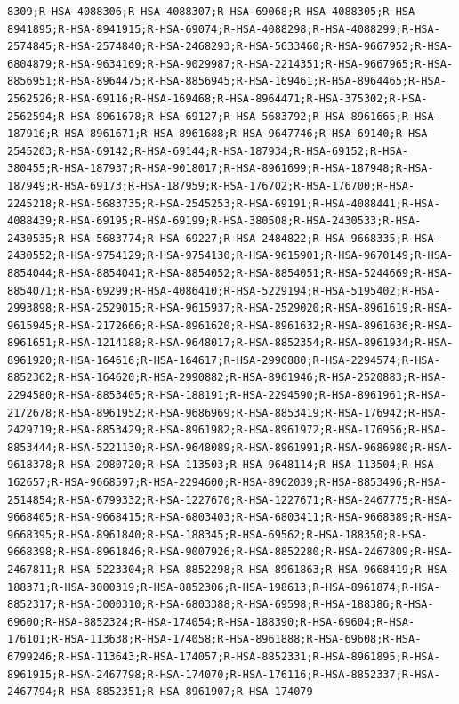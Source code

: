 \documentclass[
  letterpaper,
  DIV=11,
  numbers=noendperiod]{scrartcl}
\begin{document}
\begin{verbatim}
8309;R-HSA-4088306;R-HSA-4088307;R-HSA-69068;R-HSA-4088305;R-HSA-8941895;R-HSA-8941915;R-HSA-69074;R-HSA-4088298;R-HSA-4088299;R-HSA-2574845;R-HSA-2574840;R-HSA-2468293;R-HSA-5633460;R-HSA-9667952;R-HSA-6804879;R-HSA-9634169;R-HSA-9029987;R-HSA-2214351;R-HSA-9667965;R-HSA-8856951;R-HSA-8964475;R-HSA-8856945;R-HSA-169461;R-HSA-8964465;R-HSA-2562526;R-HSA-69116;R-HSA-169468;R-HSA-8964471;R-HSA-375302;R-HSA-2562594;R-HSA-8961678;R-HSA-69127;R-HSA-5683792;R-HSA-8961665;R-HSA-187916;R-HSA-8961671;R-HSA-8961688;R-HSA-9647746;R-HSA-69140;R-HSA-2545203;R-HSA-69142;R-HSA-69144;R-HSA-187934;R-HSA-69152;R-HSA-380455;R-HSA-187937;R-HSA-9018017;R-HSA-8961699;R-HSA-187948;R-HSA-187949;R-HSA-69173;R-HSA-187959;R-HSA-176702;R-HSA-176700;R-HSA-2245218;R-HSA-5683735;R-HSA-2545253;R-HSA-69191;R-HSA-4088441;R-HSA-4088439;R-HSA-69195;R-HSA-69199;R-HSA-380508;R-HSA-2430533;R-HSA-2430535;R-HSA-5683774;R-HSA-69227;R-HSA-2484822;R-HSA-9668335;R-HSA-2430552;R-HSA-9754129;R-HSA-9754130;R-HSA-9615901;R-HSA-9670149;R-HSA-8854044;R-HSA-8854041;R-HSA-8854052;R-HSA-8854051;R-HSA-5244669;R-HSA-8854071;R-HSA-69299;R-HSA-4086410;R-HSA-5229194;R-HSA-5195402;R-HSA-2993898;R-HSA-2529015;R-HSA-9615937;R-HSA-2529020;R-HSA-8961619;R-HSA-9615945;R-HSA-2172666;R-HSA-8961620;R-HSA-8961632;R-HSA-8961636;R-HSA-8961651;R-HSA-1214188;R-HSA-9648017;R-HSA-8852354;R-HSA-8961934;R-HSA-8961920;R-HSA-164616;R-HSA-164617;R-HSA-2990880;R-HSA-2294574;R-HSA-8852362;R-HSA-164620;R-HSA-2990882;R-HSA-8961946;R-HSA-2520883;R-HSA-2294580;R-HSA-8853405;R-HSA-188191;R-HSA-2294590;R-HSA-8961961;R-HSA-2172678;R-HSA-8961952;R-HSA-9686969;R-HSA-8853419;R-HSA-176942;R-HSA-2429719;R-HSA-8853429;R-HSA-8961982;R-HSA-8961972;R-HSA-176956;R-HSA-8853444;R-HSA-5221130;R-HSA-9648089;R-HSA-8961991;R-HSA-9686980;R-HSA-9618378;R-HSA-2980720;R-HSA-113503;R-HSA-9648114;R-HSA-113504;R-HSA-162657;R-HSA-9668597;R-HSA-2294600;R-HSA-8962039;R-HSA-8853496;R-HSA-2514854;R-HSA-6799332;R-HSA-1227670;R-HSA-1227671;R-HSA-2467775;R-HSA-9668405;R-HSA-9668415;R-HSA-6803403;R-HSA-6803411;R-HSA-9668389;R-HSA-9668395;R-HSA-8961840;R-HSA-188345;R-HSA-69562;R-HSA-188350;R-HSA-9668398;R-HSA-8961846;R-HSA-9007926;R-HSA-8852280;R-HSA-2467809;R-HSA-2467811;R-HSA-5223304;R-HSA-8852298;R-HSA-8961863;R-HSA-9668419;R-HSA-188371;R-HSA-3000319;R-HSA-8852306;R-HSA-198613;R-HSA-8961874;R-HSA-8852317;R-HSA-3000310;R-HSA-6803388;R-HSA-69598;R-HSA-188386;R-HSA-69600;R-HSA-8852324;R-HSA-174054;R-HSA-188390;R-HSA-69604;R-HSA-176101;R-HSA-113638;R-HSA-174058;R-HSA-8961888;R-HSA-69608;R-HSA-6799246;R-HSA-113643;R-HSA-174057;R-HSA-8852331;R-HSA-8961895;R-HSA-8961915;R-HSA-2467798;R-HSA-174070;R-HSA-176116;R-HSA-8852337;R-HSA-2467794;R-HSA-8852351;R-HSA-8961907;R-HSA-174079

\end{verbatim}
\end{document}
